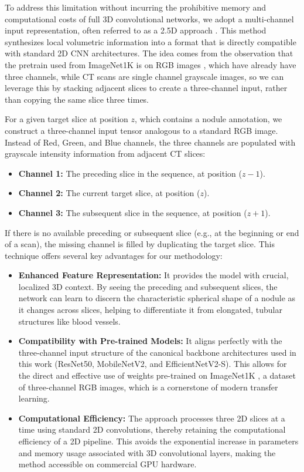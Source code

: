 To address this limitation without incurring the prohibitive memory and computational costs of full 3D convolutional networks, we adopt a multi-channel input representation, often referred to as a 2.5D approach \cite{zhou2023multislice}. This method synthesizes local volumetric information into a format that is directly compatible with standard 2D CNN architectures.
The idea comes from the observation that the pretrain used from ImageNet1K is on RGB images \cite{russakovsky2015imagenet}, which have already have three channels, while CT scans are single channel grayscale images, so we can leverage this by stacking adjacent slices to create a three-channel input, rather than copying the same slice three times.

For a given target slice at position $z$, which contains a nodule annotation, we construct a three-channel input tensor analogous to a standard RGB image. Instead of Red, Green, and Blue channels, the three channels are populated with grayscale intensity information from adjacent CT slices:

\begin{itemize}
    \item \textbf{Channel 1:} The preceding slice in the sequence, at position ($z-1$).
    \item \textbf{Channel 2:} The current target slice, at position ($z$).
    \item \textbf{Channel 3:} The subsequent slice in the sequence, at position ($z+1$).
\end{itemize}
If there is no available preceding or subsequent slice (e.g., at the beginning or end of a scan), the missing channel is filled by duplicating the target slice.
This technique offers several key advantages for our methodology:

\begin{itemize}
    \item \textbf{Enhanced Feature Representation:} It provides the model with crucial, localized 3D context. By seeing the preceding and subsequent slices, the network can learn to discern the characteristic spherical shape of a nodule as it changes across slices, helping to differentiate it from elongated, tubular structures like blood vessels.

    \item \textbf{Compatibility with Pre-trained Models:} It aligns perfectly with the three-channel input structure of the canonical backbone architectures used in this work (ResNet50, MobileNetV2, and EfficientNetV2-S). This allows for the direct and effective use of weights pre-trained on ImageNet1K \cite{russakovsky2015imagenet}, a dataset of three-channel RGB images, which is a cornerstone of modern transfer learning.

    \item \textbf{Computational Efficiency:} The approach processes three 2D slices at a time using standard 2D convolutions, thereby retaining the computational efficiency of a 2D pipeline. This avoids the exponential increase in parameters and memory usage associated with 3D convolutional layers, making the method accessible on commercial GPU hardware.
\end{itemize}

